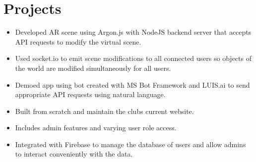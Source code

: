 \documentclass{resume}
\newcommand{\present}{$\rightarrow$}
\begin{document}
\begin{minipage}[t]{0.63\linewidth}
\section{Projects}
\begin{itemize}
    \item Developed AR scene using Argon.js with NodeJS backend server that accepts API requests to modify the virtual scene.
    \item Used socket.io to emit scene modifications to all connected users so objects of the world are modified simultaneously for all users.
    \item Demoed app using bot created with MS Bot Framework and LUIS.ai to send appropriate API requests using natural language.
\end{itemize}
\begin{itemize}
    \item Built from scratch and maintain the clubs current website.
    \item Includes admin features and varying user role access.
    \item Integrated with Firebase to manage the database of users and allow admins to interact conveniently with the data.
\end{itemize}

\end{minipage}
\end{document}

